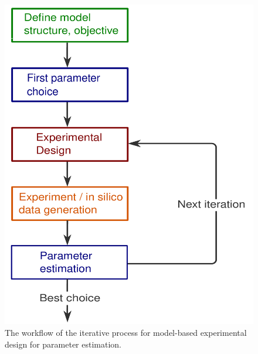 \documentclass[10pt,A4paper]{article}
\begin{document}
\begin{figure}[H]
    \centering
    \includegraphics[scale=0.3]{Figures/scheme.pdf}
    \caption{{\footnotesize The workflow of the iterative process for model-based experimental design for parameter estimation.}}
    \label{fig:expdesign_scheme}
\end{figure}
%
%
%
\end{document}
